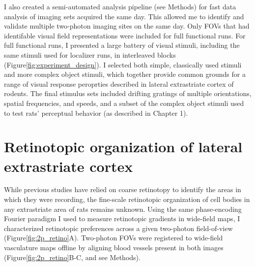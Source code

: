 I also created a semi-automated analysis pipeline (see Methods) for fast data analysis of imaging sets acquired the same day. This allowed me to identify and validate multiple two-photon imaging sites on the same day. Only FOVs that had identifable visual field representations were included for full functional runs. For full functional runs, I presented a large battery of visual stimuli, including the same stimuli used for localizer runs, in interleaved blocks (Figure\ref{fig:experiment_design}). I selected both simple, classically used stimuli and more complex object stimuli, which together provide common grounds for a range of visual response peroprties described in lateral extrastriate cortex of rodents. The final stimulus sets included drifting gratings of multiple orientations, spatial frequencies, and speeds, and a subset of the complex object stimuli used to test rats' perceptual behavior (as described in Chapter 1).


\section{Retinotopic organization of lateral extrastriate cortex}
While previous studies have relied on coarse retinotopy to identify the areas in which they were recording, the fine-scale retinotopic organization of cell bodies in any extrastriate area of rats remains unknown. Using the same phase-encoding Fourier paradigm I used to measure retinotopic gradients in wide-field maps, I characterized retinotopic preferences across a given two-photon field-of-view (Figure\ref{fig:2p_retino}A). Two-photon FOVs were registered to wide-field vasculature maps offline by aligning blood vessels present in both images (Figure\ref{fig:2p_retino}B-C, and see Methods). 

